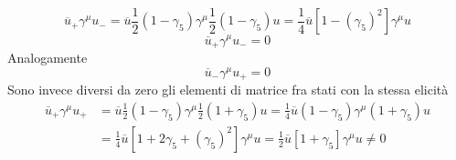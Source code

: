$$
\overline{u}_+ \gamma^\mu u_- = \overline{u} \frac{1}{2}(1 - \gamma_5) \gamma^\mu \frac{1}{2}(1 - \gamma_5) u = \frac{1}{4} \overline{u} [1 - (\gamma_5)^2] \gamma^\mu u
$$
$$
\overline{u}_+ \gamma^\mu u_- = 0
$$
Analogamente 
$$
\overline{u}_- \gamma^\mu u_+ = 0
$$
Sono invece diversi da zero gli elementi di matrice fra stati con la stessa elicità
\begin{align*}
\overline{u}_+ \gamma^\mu u_+ &= \overline{u} \frac{1}{2}(1 - \gamma_5) \gamma^\mu \frac{1}{2}(1 + \gamma_5) u = \frac{1}{4} \overline{u} (1 - \gamma_5) \gamma^\mu (1 + \gamma_5) u \\
&= \frac{1}{4} \overline{u} [1 + 2\gamma_5 + (\gamma_5)^2] \gamma^\mu u = \frac{1}{2} \overline{u} [1 + \gamma_5] \gamma^\mu u \neq 0
\end{align*}
